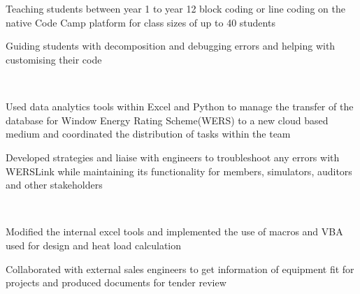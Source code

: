 \documentclass[11pt, a4paper]{MagicalCV}
\begin{document}
\begin{minipage}[t]{0.58\textwidth} 

\sectionsep \\ %
 \\
\vspace{\topsep} %
\begin{tightemize}
\item Teaching students between year 1 to year 12 block coding or line coding on the native Code Camp platform for class sizes of up to 40 students
\item Guiding students with decomposition and debugging errors and helping with customising their code
\end{tightemize}
\sectionsep

 \\
\vspace{\topsep} %
\begin{tightemize}
\item Used data analytics tools within Excel and Python to manage the transfer of the database for Window Energy Rating Scheme(WERS) to a new cloud based medium and coordinated the distribution of tasks within the team
\item Developed strategies and liaise with engineers to troubleshoot any errors with WERSLink while maintaining its functionality for members, simulators, auditors and other stakeholders
\end{tightemize}
\sectionsep

 \\
\vspace{\topsep} %
\begin{tightemize}
\item Modified the internal excel tools and implemented the use of macros and VBA used for design and heat load calculation
\item Collaborated with external sales engineers to get information of equipment fit for projects and produced documents for tender review
\end{tightemize}
\sectionsep


\end{minipage}
\end{document}
